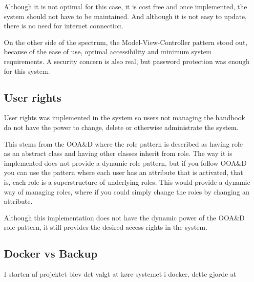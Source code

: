 Although it is not optimal for this case, it is cost free and once implemented, the system should not have to be maintained. And although it is not easy to update, there is no need for internet connection.

On the other side of the spectrum, the Model-View-Controller pattern stood out, because of the ease of use, optimal accessibility and minimum system requirements. A security concern is also real, but password protection was enough for this system.

\subsection{User rights}

User rights was implemented in the system so users not managing the handbook do not have the power to change, delete or otherwise administrate the system.

This stems from the OOA\&D where the role pattern is described as having role as an abstract class and having other classes inherit from role. The way it is implemented does not provide a dynamic role pattern, but if you follow OOA\&D you can use the pattern where each user has an attribute that is activated, that is, each role is a superstructure of underlying roles. This would provide a dynamic way of managing roles, where if you could simply change the roles by changing an attribute. 

Although this implementation does not have the dynamic power of the OOA\&D role pattern, it still provides the desired access rights in the system. 

\subsection{Docker vs Backup}

I starten af projektet blev det valgt at køre systemet i docker, dette gjorde at  
